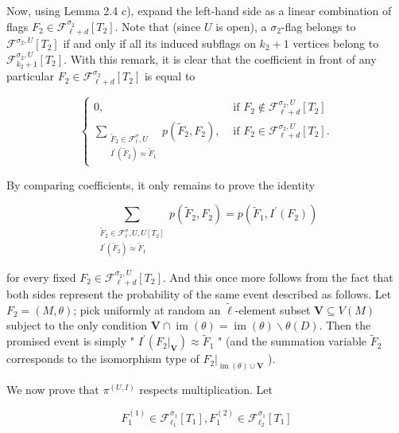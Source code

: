 \documentclass[10pt]{article}
\begin{document}
Now, using Lemma 2.4 c), expand the left-hand side as a linear combination of flags $F_{2} \in \mathcal{F}_{\ell+d}^{\sigma_{2}}\left[T_{2}\right]$. Note that (since $U$ is open), a $\sigma_{2}$-flag belongs to $\mathcal{F}^{\sigma_{2}, U}\left[T_{2}\right]$ if and only if all its induced subflags on $k_{2}+1$ vertices belong to $\mathcal{F}_{k_{2}+1}^{\sigma_{2}, U}\left[T_{2}\right]$. With this remark, it is clear that the coefficient in front of any particular $F_{2} \in \mathcal{F}_{\ell+d}^{\sigma_{2}}\left[T_{2}\right]$ is equal to

$$
\begin{cases}0, & \text { if } F_{2} \notin \mathcal{F}_{\ell+d}^{\sigma_{2}, U}\left[T_{2}\right] \\ \sum_{\substack{\widetilde{F}_{2} \in \mathcal{F}_{\ell}^{\sigma}, U \\ I^{\prime}\left(\widetilde{F}_{2}\right) \approx \widetilde{F}_{1}}} p\left(\widetilde{F}_{2}, F_{2}\right), & \text { if } F_{2} \in \mathcal{F}_{\ell+d}^{\sigma_{2}, U}\left[T_{2}\right] .\end{cases}
$$

By comparing coefficients, it only remains to prove the identity

$$
\sum_{\substack{\widetilde{F}_{2} \in \mathcal{F}_{\ell}^{\sigma}, U, U\left[T_{2}\right] \\ I^{\prime}\left(\widetilde{F}_{2}\right) \approx \widetilde{F}_{1}}} p\left(\widetilde{F}_{2}, F_{2}\right)=p\left(\widetilde{F}_{1}, I^{\prime}\left(F_{2}\right)\right)
$$

for every fixed $F_{2} \in \mathcal{F}_{\ell+d}^{\sigma_{2}, U}\left[T_{2}\right]$. And this once more follows from the fact that both sides represent the probability of the same event described as follows. Let $F_{2}=(M, \theta)$; pick uniformly at random an $\tilde{\ell}$-element subset $\boldsymbol{V} \subseteq V(M)$ subject to the only condition $\boldsymbol{V} \cap \operatorname{im}(\theta)=\operatorname{im}(\theta) \backslash \theta(D)$. Then the promised event is simply " $I^{\prime}\left(\left.F_{2}\right|_{\boldsymbol{V}}\right) \approx \widetilde{F}_{1}$ " (and the summation variable $\widetilde{F}_{2}$ corresponds to the isomorphism type of $\left.F_{2}\right|_{\operatorname{im}(\theta) \cup \boldsymbol{V}}$ ).

We now prove that $\pi^{(U, I)}$ respects multiplication. Let

$$
F_{1}^{(1)} \in \mathcal{F}_{\ell_{1}}^{\sigma_{1}}\left[T_{1}\right], F_{1}^{(2)} \in \mathcal{F}_{\ell_{2}}^{\sigma_{1}}\left[T_{1}\right]
$$
\end{document}
